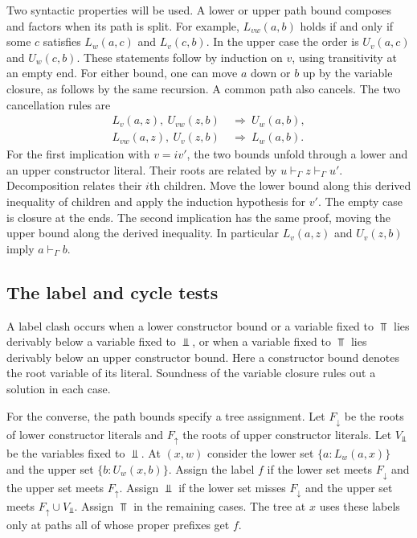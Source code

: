 Two syntactic properties will be used. A lower or upper path bound
composes and factors when its path is split. For example,
$L_{vw}(a,b)$ holds if and only if some $c$ satisfies $L_w(a,c)$ and
$L_v(c,b)$. In the upper case the order is $U_v(a,c)$ and $U_w(c,b)$.
These statements follow by induction on $v$, using transitivity at an
empty end. For either bound, one can move $a$ down or $b$ up by the
variable closure, as follows by the same recursion. A common path
also cancels. The two cancellation rules are
\[
 \begin{aligned}
     L_v(a,z),\ U_{vw}(z,b)&\ \Longrightarrow\ U_w(a,b),\\
     L_{vw}(a,z),\ U_v(z,b)&\ \Longrightarrow\ L_w(a,b).
 \end{aligned}
\]
For the first implication with $v=i v'$, the two bounds unfold
through a lower and an upper constructor literal. Their roots are
related by $u\vdash_\Gamma z\vdash_\Gamma u'$. Decomposition relates
their $i$th children. Move the lower bound along this derived
inequality of children and apply the induction hypothesis for $v'$.
The empty case is closure at the ends. The second implication has
the same proof, moving the upper bound along the derived inequality.
In particular $L_v(a,z)$ and $U_v(z,b)$ imply $a\vdash_\Gamma b$.

\subsection{The label and cycle tests}

A label clash occurs when a lower constructor bound or a variable
fixed to $\Top$ lies derivably below a variable fixed to $\Bot$,
or when a variable fixed to $\Top$ lies derivably below an upper
constructor bound. Here a constructor bound denotes the root variable
of its literal. Soundness of the variable closure rules out a solution
in each case.

For the converse, the path bounds specify a tree assignment.
Let $F_\downarrow$ be the roots of lower constructor literals and
$F_\uparrow$ the roots of upper constructor literals. Let $V_\Bot$
be the variables fixed to $\Bot$. At $(x,w)$ consider the lower set
$\{a:L_w(a,x)\}$ and the upper set $\{b:U_w(x,b)\}$. Assign the label
$f$ if the lower set meets $F_\downarrow$ and the upper set meets
$F_\uparrow$. Assign $\Bot$ if the lower set misses $F_\downarrow$
and the upper set meets $F_\uparrow\cup V_\Bot$. Assign $\Top$ in
the remaining cases. The tree at $x$ uses these labels only at paths
all of whose proper prefixes get $f$.

